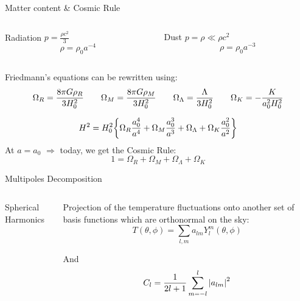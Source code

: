 \documentclass{beamer}
\begin{document}
\begin{frame}{Matter content \& Cosmic Rule}

    	\begin{columns}
        	\begin{column}{0.5\textwidth}
        	    	\begin{center}
        	    	Radiation $p = \frac{\rho c^2}{3}$
        	    	$$\rho = \rho_0 a^{-4}$$
              	\end{center}

        	\end{column}
            \begin{column}{0.5\textwidth}
             \begin{center}
              Dust $p=\rho \ll \rho c^2$
              $$\rho = \rho_0 a^{-3}$$
             \end{center}
        	\end{column}
    	\end{columns}
    	
    	\vspace{0.5cm}
    	Friedmann's equations can be rewritten using:
    	\begin{eqnarray}
    	     \Omega_R = \frac{8 \pi G \rho_R}{3 H_0 ^2} \qquad
    	     \Omega_M =  \frac{8 \pi G \rho_M}{3 H_0 ^2} \qquad
    	     \Omega_\Lambda =  \frac{\Lambda}{3 H_0 ^2} \qquad
    	     \Omega_K = -\frac{K}{a_0 ^2 H_0 ^2} \notag
    	\end{eqnarray}
    	    	
    	$$
    	H^2 = H_0 ^2 \qty{\Omega_R \frac{a_0 ^4}{a^4} + \Omega_M \frac{a_0 ^3}{a^3} + \Omega_\Lambda + \Omega_K \frac{a_0 ^2}{a^2}} 
    	$$
    	At $a =a_0$ $\Rightarrow$ today, we get the Cosmic Rule: 
    	$$
    	1 = \Omega_R +  \Omega_M + \Omega_\Lambda + \Omega_K
    	$$
    	\end{frame}

\begin{frame}{Multipoles Decomposition}
    	\begin{columns}
		\begin{column}{4cm}
			 \animategraphics[loop,controls,width=\textwidth]{4}{multipole-}{0}{34}
			\begin{center}
				\tiny
				Spherical Harmonics
			\end{center}
		\end{column}
		\begin{column}{6cm}
			Projection of the temperature fluctuations onto another set of basis functions which are orthonormal on the sky:
			$$
			 T(\theta,\phi) = \sum_{l,m} a_{lm} Y^m _l (\theta,\phi)
			$$
			
			And $$C_l = \frac{1}{2l +1} \sum _{m=-l} ^l \abs{a_{lm}} ^2$$
		\end{column}
	\end{columns}
    
\end{frame}
\end{document}
